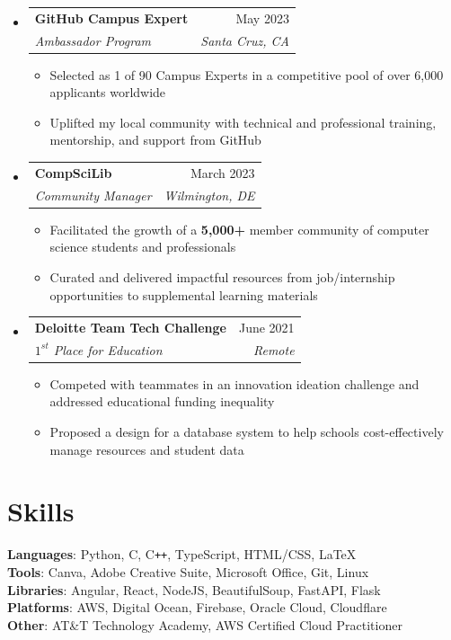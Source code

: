 \documentclass[letterpaper,11pt]{article}
\makeatletter
\newcommand{\resumeItem}[1]{
  \item\small{
    {#1 \vspace{-2pt}}
  }
}
\newcommand{\resumeSubheading}[4]{
  \vspace{-2pt}\item
    \begin{tabular*}{0.97\textwidth}[t]{l@{\extracolsep{\fill}}r}
      \textbf{#1} & #2 \\
      \textit{\small#3} & \textit{\small #4} \\
    \end{tabular*}\vspace{-7pt}
}
\newcommand{\resumeSubHeadingListStart}{\begin{itemize}[leftmargin=0.15in, label={}]}
\newcommand{\resumeSubHeadingListEnd}{\end{itemize}}
\newcommand{\resumeItemListStart}{\begin{itemize}}
\newcommand{\resumeItemListEnd}{\end{itemize}\vspace{-5pt}}
\makeatother
\begin{document}
\resumeSubHeadingListStart
\resumeSubheading{GitHub Campus Expert}{May 2023}{Ambassador Program}{Santa Cruz, CA}
\resumeItemListStart
\resumeItem{Selected as 1 of 90 Campus Experts in a competitive pool of over 6,000 applicants worldwide}
\resumeItem{Uplifted my local community with technical and professional training, mentorship, and support from GitHub}
\resumeItemListEnd

\resumeSubheading{CompSciLib}{March 2023}{Community Manager}{Wilmington, DE}
\resumeItemListStart
\resumeItem{Facilitated the growth of a \textbf{5,000+} member community of computer science students and professionals}
\resumeItem{Curated and delivered impactful resources from job/internship opportunities to supplemental learning materials}
\resumeItemListEnd

\resumeSubheading{Deloitte Team Tech Challenge}{June 2021}{$1^{st}$ Place for Education}{Remote}
\resumeItemListStart
\resumeItem{Competed with teammates in an innovation ideation challenge and addressed educational funding inequality}
\resumeItem{Proposed a design for a database system to help schools cost-effectively manage resources and student data}
\resumeItemListEnd


\resumeSubHeadingListEnd
\vspace{-10pt}

\section{Skills}
\begin{itemize}[leftmargin=0.15in, label={}]
	\small{\item{
		            \textbf{Languages}{: Python, C, C\texttt{++}, TypeScript, HTML/CSS, \LaTeX} \\
		            \textbf{Tools}{: Canva, Adobe Creative Suite, Microsoft Office, Git, Linux} \\
		            \textbf{Libraries}{: Angular, React, NodeJS, BeautifulSoup, FastAPI, Flask} \\
		            \textbf{Platforms}{: AWS, Digital Ocean, Firebase, Oracle Cloud, Cloudflare} \\
		            \textbf{Other}{: AT\&T Technology Academy, AWS Certified Cloud Practitioner} \\
		      }}
\end{itemize}
\end{document}
